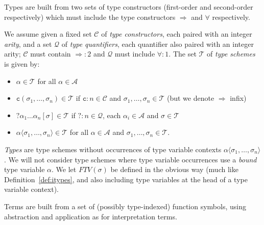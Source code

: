 \documentclass[runningheads,a4paper]{llncs}
\newcommand{\Typevars}{\mathcal{A}}
\newcommand{\Types}{\mathcal{T}}
\newcommand{\TypeConstructors}{\mathcal{C}}
\newcommand{\TypeQuantifiers}{\mathcal{Q}}
\newcommand{\qquant}[3]{#1 #2[#3]}
\newcommand{\arrtype}{\Rightarrow}
\newcommand{\meta}[2]{#1\langle#2\rangle}
\newcommand{\FTV}{\mathit{FTV}}
\newcommand{\con}{\mathtt{c}}
\begin{document}
Types are built from two sets of type constructors (first-order and
second-order respectively) which must include the type constructors
$\arrtype$ and $\forall$ respectively.

\begin{definition}
We assume given a fixed set $\TypeConstructors$ of \emph{type
constructors}, each paired with an integer \emph{arity}, and a set
$\TypeQuantifiers$ of \emph{type quantifiers}, each quantifier also
paired with an integer arity; $\TypeConstructors$ must contain
$\arrtype : 2$ and $\TypeQuantifiers$ must include $\forall : 1$.
The set $\Types$ of \emph{type schemes} is given by:
\begin{itemize}
\item $\alpha \in \Types$ for all $\alpha \in \Typevars$
\item $\con(\sigma_1,\dots,\sigma_n) \in \Types$ if $\con : n \in
  \TypeConstructors$ and $\sigma_1,\dots,\sigma_n \in \Types$
  (but we denote $\arrtype$ infix)
\item $\qquant{?}{\alpha_1 \dots \alpha_n}{\sigma} \in \Types$ if
  $? : n \in \TypeQuantifiers$, each $\alpha_i \in \Typevars$ and
  $\sigma \in \Types$
\item $\meta{\alpha}{\sigma_1,\dots,\sigma_n} \in \Types$ for all
  $\alpha \in \Typevars$ and $\sigma_1,\dots,\sigma_n \in \Types$.
\end{itemize}
\emph{Types} are type schemes without occurrences of type variable
contexts $\meta{\alpha}{\sigma_1,\dots,\sigma_n}$.
We will not consider type schemes where type variable occurrences
use a \emph{bound} type variable $\alpha$.
We let $\FTV(\sigma)$ be defined in the obvious way (much like
Definition~\ref{def:itypes}, and also including type variables at
the head of a type variable context).
\end{definition}

Terms are built from a set of (possibly type-indexed) function symbols,
using abstraction and application as for interpretation terms.
\end{document}
